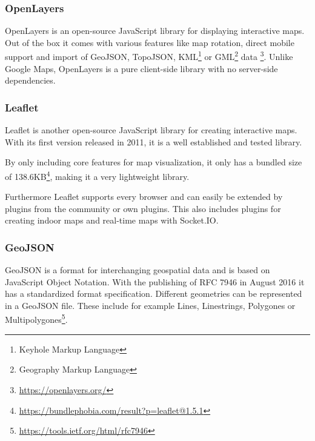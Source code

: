 \subsubsection{OpenLayers}
\label{OpenLayers}

OpenLayers is an open-source JavaScript library for displaying interactive maps. Out of the box it comes with various features like map rotation, direct mobile support and import of GeoJSON, TopoJSON, KML\footnote{Keyhole Markup Language} or GML\footnote{Geography Markup Language} data \footnote{\url{https://openlayers.org/}}. Unlike Google Maps, OpenLayers is a pure client-side library with no server-side dependencies. 



\subsubsection{Leaflet}
\label{Leaflet}

Leaflet is another open-source JavaScript library for creating interactive maps. With its first version released in 2011, it is a well established and tested library. 

By only including core features for map visualization, it only has a bundled size of 138.6KB\footnote{\url{https://bundlephobia.com/result?p=leaflet@1.5.1}}, making it a very lightweight library.

Furthermore Leaflet supports every browser and can easily be extended by plugins from the community or own plugins.
This also includes plugins for creating indoor maps \cite{baines_provides_2019} and real-time maps with Socket.IO.

\subsubsection{GeoJSON}
\label{GeoJSON}

GeoJSON is a format for interchanging geospatial data and is based on JavaScript Object Notation. With the publishing of RFC 7946 in August 2016 it has a standardized format specification.
Different geometries can be represented in a GeoJSON file. These include for example Lines, Linestrings, Polygones or Multipolygones\footnote{\url{https://tools.ietf.org/html/rfc7946}}. 

